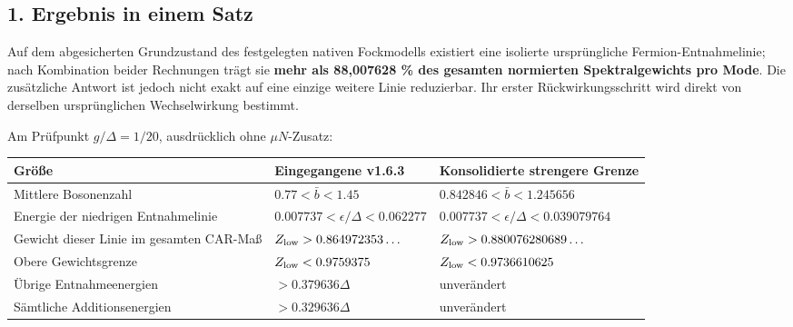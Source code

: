 \subsection{1. Ergebnis in einem Satz}\label{ergebnis-in-einem-satz}

Auf dem abgesicherten Grundzustand des festgelegten nativen Fockmodells
existiert eine isolierte ursprüngliche Fermion-Entnahmelinie; nach
Kombination beider Rechnungen trägt sie \textbf{mehr als 88,007628 \%
des gesamten normierten Spektralgewichts pro Mode}. Die zusätzliche
Antwort ist jedoch nicht exakt auf eine einzige weitere Linie
reduzierbar. Ihr erster Rückwirkungsschritt wird direkt von derselben
ursprünglichen Wechselwirkung bestimmt.

Am Prüfpunkt \(g/\Delta=1/20\), ausdrücklich ohne \(\mu N\)-Zusatz:

{\def\LTcaptype{none} %
\begin{longtable}[]{@{}
  >{\raggedright\arraybackslash}p{}
  >{\raggedleft\arraybackslash}p{}
  >{\raggedleft\arraybackslash}p{}@{}}
\toprule\noalign{}
\begin{minipage}[b]{\linewidth}\raggedright
Größe
\end{minipage} & \begin{minipage}[b]{\linewidth}\raggedleft
Eingegangene v1.6.3
\end{minipage} & \begin{minipage}[b]{\linewidth}\raggedleft
Konsolidierte strengere Grenze
\end{minipage} \\
\midrule\noalign{}
\endhead
\bottomrule\noalign{}
\endlastfoot
Mittlere Bosonenzahl & \(0.77<\bar b<1.45\) &
\(0.842846<\bar b<1.245656\) \\
Energie der niedrigen Entnahmelinie &
\(0.007737<\epsilon/\Delta<0.062277\) &
\(0.007737<\epsilon/\Delta<0.039079764\) \\
Gewicht dieser Linie im gesamten CAR-Maß &
\(Z_{\rm low}>0.864972353\ldots\) &
\(Z_{\rm low}>0.880076280689\ldots\) \\
Obere Gewichtsgrenze & \(Z_{\rm low}<0.9759375\) &
\(Z_{\rm low}<0.9736610625\) \\
Übrige Entnahmeenergien & \(>0.379636\Delta\) & unverändert \\
Sämtliche Additionsenergien & \(>0.329636\Delta\) & unverändert \\
\end{longtable}
}

